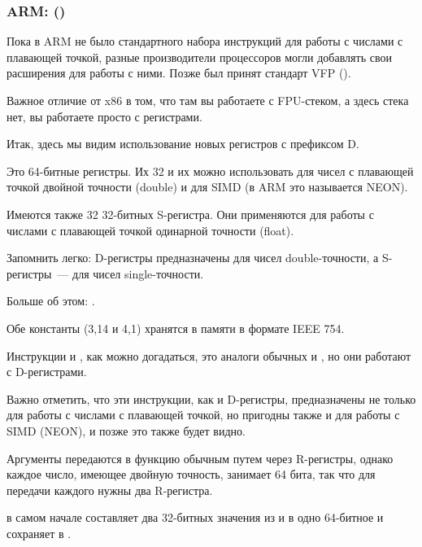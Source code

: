 \subsubsection{ARM: \OptimizingXcodeIV (\ARMMode)}

Пока в ARM не было стандартного набора инструкций для работы с числами с плавающей точкой, разные производители процессоров
могли добавлять свои расширения для работы с ними.
Позже был принят стандарт VFP ().

Важное отличие от x86 в том, что там вы работаете с FPU-стеком, а здесь стека нет, вы работаете просто с регистрами.



Итак, здесь мы видим использование новых регистров с префиксом D.

Это 64-битные регистры. Их 32 и их можно
использовать для чисел с плавающей точкой двойной точности (double) и для 
SIMD (в ARM это называется NEON).

Имеются также 32 32-битных S-регистра. Они применяются для работы с числами 
с плавающей точкой одинарной точности (float).

Запомнить легко: D-регистры предназначены для чисел double-точности, 
а S-регистры~--- для чисел single-точности.

Больше об этом: .

Обе константы (3,14 и 4,1) хранятся в памяти в формате IEEE 754.

Инструкции  и , как можно догадаться, это аналоги обычных  и \MOV, но они работают с D-регистрами.

Важно отметить, что эти инструкции, как и D-регистры, предназначены не только для работы 
с числами с плавающей точкой, но пригодны также и для работы с SIMD (NEON), и позже это также будет видно.

Аргументы передаются в функцию обычным путем через R-регистры, однако 
каждое число, имеющее двойную точность, занимает 64 бита, так что для передачи каждого нужны два R-регистра.

 в самом начале составляет два 32-битных значения из  и  в одно 64-битное и сохраняет в .

